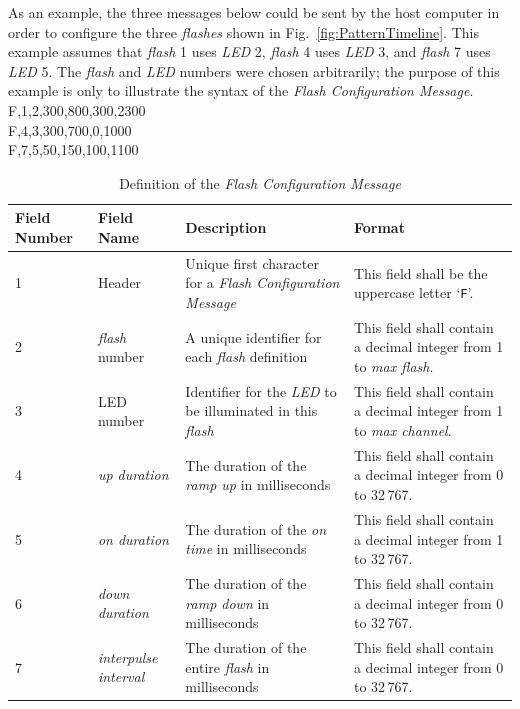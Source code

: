 \documentclass[letterpaper,11pt]{article}
\begin{document}
As an example, the three messages below could be sent by the host computer in
order to configure the three \textit{flashes} shown in Fig.\
\ref{fig:PatternTimeline}. This example assumes that \textit{flash} 1 uses
\textit{LED} 2, \textit{flash} 4 uses \textit{LED} 3, and \textit{flash} 7 uses
\textit{LED} 5. The \textit{flash} and \textit{LED} numbers were chosen
arbitrarily; the purpose of this example is only to illustrate the syntax of
the \textit{Flash Configuration Message}.\\[12pt]
{\ttfamily
F,1,2,300,800,300,2300\\
F,4,3,300,700,0,1000\\
F,7,5,50,150,100,1100\\
}

\begin{table}[h]
\centering
\caption{Definition of the \textit{Flash Configuration Message}}
\label{tab:FlashConfig}
\setlength\extrarowheight{2pt}
\begin{tabular}[h]{|p{0.5in}|p{1.00in}|p{2.25in}|p{2.25in}|} \hline
Field Number & Field Name & Description & Format \\ \hline
1            & Header
             & Unique first character for a \textit{Flash Configuration Message}
             & This field shall be the uppercase letter `\texttt{F}'.
             \\ \hline
2            & \textit{flash} number
             & A unique identifier for each \textit{flash} definition
             & This field shall contain a decimal integer from 1 to
             \textit{max flash}.
             \\ \hline
3            & LED number
             & Identifier for the \textit{LED} to be illuminated in this
             \textit{flash}
             & This field shall contain a decimal integer from 1 to
             \textit{max channel}.
             \\ \hline
4            & \textit{up duration}
             & The duration of the \textit{ramp up} in milliseconds
             & This field shall contain a decimal integer from 0 to 32\,767.
             \\ \hline
5            & \textit{on duration}
             & The duration of the \textit{on time} in milliseconds
             & This field shall contain a decimal integer from 1 to 32\,767.
             \\ \hline
6            & \textit{down duration}
             & The duration of the \textit{ramp down} in milliseconds
             & This field shall contain a decimal integer from 0 to 32\,767.
             \\ \hline
7            & \textit{interpulse interval}
             & The duration of the entire \textit{flash} in milliseconds
             & This field shall contain a decimal integer from 0 to 32\,767.
             \\ \hline
\end{tabular}
\end{table}
\end{document}
